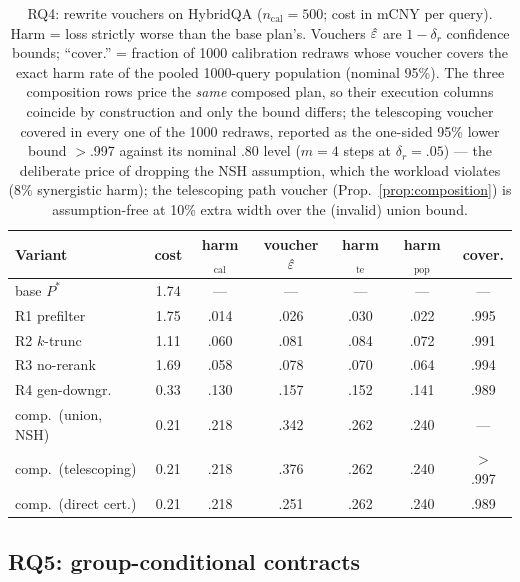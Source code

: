 \begin{table}[t]
\caption{RQ4: rewrite vouchers on HybridQA ($n_{\mathrm{cal}}{=}500$;
cost in mCNY per query).
Harm = loss strictly worse than the base plan's. Vouchers $\hat{\varepsilon}$
are $1-\delta_r$ confidence bounds; ``cover.'' = fraction of 1000
calibration redraws whose voucher covers the exact harm rate of the
pooled 1000-query population (nominal 95\%). The three composition
rows price the \emph{same} composed plan, so their execution columns
coincide by construction and only the bound differs; the telescoping
voucher covered in every one of the 1000 redraws, reported as the
one-sided 95\% lower bound $>$.997 against its nominal $.80$ level
($m{=}4$ steps at $\delta_r{=}.05$) --- the deliberate price of
dropping the NSH assumption, which the workload violates
(8\% synergistic harm); the telescoping path voucher
(Prop.~\ref{prop:composition}) is assumption-free at 10\% extra width
over the (invalid) union bound.}
\label{tab:rewrites}
\centering\scriptsize
\setlength{\tabcolsep}{2.2pt}
\begin{tabular}{lcccccc}
\toprule
Variant & cost & harm$_{\mathrm{cal}}$ & voucher $\hat{\varepsilon}$
& harm$_{\mathrm{te}}$ & harm$_{\mathrm{pop}}$ & cover. \\
\midrule
base $P^\ast$    & 1.74 & ---  & ---  & ---  & --- & --- \\
R1 prefilter     & 1.75 & .014 & .026 & .030 & .022 & .995 \\
R2 $k$-trunc     & 1.11 & .060 & .081 & .084 & .072 & .991 \\
R3 no-rerank     & 1.69 & .058 & .078 & .070 & .064 & .994 \\
R4 gen-downgr.   & 0.33 & .130 & .157 & .152 & .141 & .989 \\
\midrule
comp.\ (union, NSH) & 0.21 & .218 & .342 & .262 & .240 & --- \\
comp.\ (telescoping) & 0.21 & .218 & .376 & .262 & .240 & $>$.997 \\
comp.\ (direct cert.) & 0.21 & .218 & .251 & .262 & .240 & .989 \\
\bottomrule
\end{tabular}
\end{table}

\subsection{RQ5: group-conditional contracts}
\label{sec:exp-group}

